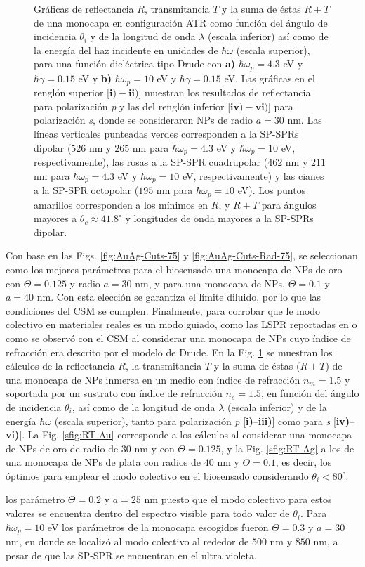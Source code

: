 \begin{figure}[h!]
	\caption{Gráficas de reflectancia $R$, transmitancia $T$ y la suma de éstas $R+T$ de una monocapa en configuración ATR como función del ángulo de incidencia $\theta_i$ y de la longitud de onda $\lambda$ (escala inferior) así como de la energía del haz incidente en unidades de $\hbar\omega$ (escala superior), para una función dieléctrica tipo Drude con \textbf{a)} $\hbar\omega_p=4. 3$ eV  y  $\hbar\gamma=0. 15$ eV y \textbf{b)} $\hbar\omega_p = 10$ eV y $\hbar\gamma = 0.15$ eV.  Las gráficas   en el renglón superior [$\mathbf{i)-ii)}$]  muestran los resultados de reflectancia para  polarización \emph{p} y las del renglón inferior  [$\mathbf{iv)-vi)}$] para polarización  \emph{s}, donde se consideraron NPs de radio $a=30$ nm. Las líneas verticales punteadas verdes corresponden a la SP-SPRs dipolar ($526$ nm y $265$ nm para $\hbar\omega_p=4.3$ eV y $\hbar\omega_p = 10$ eV, respectivamente), las rosas a la SP-SPR cuadrupolar ($462$ nm y $211$ nm para $\hbar\omega_p=4.3$ eV y $\hbar\omega_p = 10$ eV, respectivamente) y las cianes a la SP-SPR octopolar ($195$ nm para $\hbar\omega_p = 10$ eV). Los puntos amarillos corresponden a los mínimos en $R$, y $R+T$ para ángulos mayores a $\theta_c\approx 41.8^\circ$ y longitudes de onda mayores a la SP-SPRs dipolar. }\label{fig:RT-AuAg}
	\end{figure}	

Con base en las Figs. \ref{fig:AuAg-Cuts-75} y \ref{fig:AuAg-Cuts-Rad-75}, se seleccionan como los mejores parámetros para el biosensado una monocapa de NPs de oro con $\Theta=0.125$ y radio $a=30$ nm, y para una monocapa de NPs, $\Theta=0.1$ y $a=40$ nm. Con esta elección se garantiza el límite diluido, por lo que las condiciones del CSM se cumplen. Finalmente, para corrobar que le modo colectivo en materiales reales es un modo guiado, como las LSPR reportadas en \cite{kabashin2009plasmonic} o como se observó con el CSM al considerar una monocapa de NPs cuyo índice de refracción era descrito por el modelo de Drude. En la Fig. \ref{fig:RT-AuAg} se  muestran los cálculos de la reflectancia $R$, la transmitancia $T$ y la suma de éstas ($R+T$) de una monocapa de NPs inmersa en un medio con índice de refracción $n_m=1.5$ y soportada por un sustrato con índice de refracción $n_s=1.5$, en función del ángulo de incidencia $\theta_i$, así como de la longitud de onda $\lambda$ (escala inferior) y de la energía  $\hbar\omega$ (escala superior), tanto para polarización \emph{p}  [\textbf{i)}--\textbf{iii)}] como para \emph{s} [\textbf{iv)}--\textbf{vi)}]. La Fig. \ref{sfig:RT-Au} corresponde a los cálculos al considerar una monocapa de NPs de oro de radio de $30$ nm y con $\Theta=0.125$, y la  Fig. \ref{sfig:RT-Ag} a los de una monocapa de NPs de plata con radios de $40$ nm y $\Theta=0.1$, es decir, los óptimos para emplear el modo colectivo en el biosensado considerando $\theta_i<80^\circ$.


 los parámetro $\Theta=0.2$ y $a=25$ nm puesto que el modo colectivo para estos valores se encuentra dentro del espectro visible para todo valor de $\theta_i$. Para $\hbar\omega_p=10$ eV los parámetros de la monocapa escogidos fueron $\Theta=0.3$ y $a=30$ nm, en donde se localizó al modo colectivo al rededor de $500$ nm y $850$ nm, a pesar de que las SP-SPR se encuentran en el ultra violeta.
 

